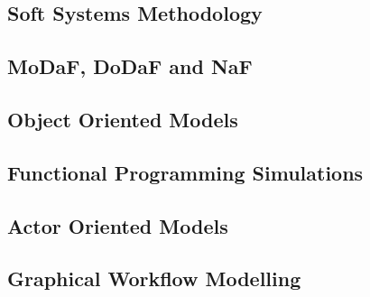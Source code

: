 \subsection{Soft Systems Methodology}




\subsection{MoDaF, DoDaF and NaF}


\subsection{Object Oriented Models}


\subsection{Functional Programming Simulations}


\subsection{Actor Oriented Models}



\subsection{Graphical Workflow Modelling}



